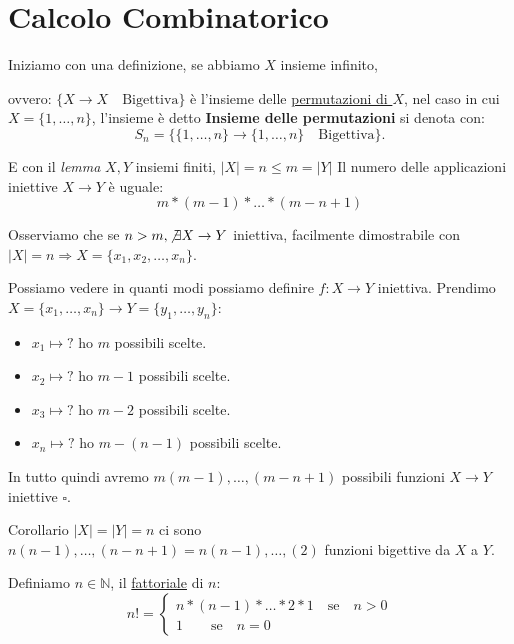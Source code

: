 \documentclass{article}
\begin{document}
\newpage
\section{Calcolo Combinatorico}

Iniziamo con una definizione, se abbiamo $X$ insieme infinito, \par ovvero: $\{X \to X \quad \mbox{Bigettiva}\}$ è l'insieme delle \underline{permutazioni di $X$}, nel caso in cui $X = \{1,\ldots, n\}$, l'insieme è detto \textbf{Insieme delle permutazioni} si denota con:
\begin{equation*}
        S_n = \{\{1,\ldots, n\} \to \{ 1,\ldots,n\} \quad \mbox{Bigettiva}\}.
\end{equation*}

E con il \textit{lemma} $X,Y$ insiemi finiti, $|X| = n \le m = |Y|$ Il numero delle applicazioni iniettive $X \to Y$ è uguale:
\begin{equation*}
        m * (m-1)*\ldots*(m-n+1)
\end{equation*}

Osserviamo che se $n > m, \not \exists X \to Y$ iniettiva, facilmente dimostrabile con $|X| = n \Rightarrow X = \{x_1,x_2,\ldots,x_n\}$. \par
Possiamo vedere in quanti modi possiamo definire $f:X \to Y$ iniettiva. 
Prendimo $X = \{x_1,\ldots,x_n\} \to Y = \{y_1,\ldots,y_n\}$:
\begin{itemize}
        \item $x_1 \mapsto \mbox{?}$ ho $m$ possibili scelte.
        \item $x_2 \mapsto \mbox{?}$ ho $m-1$ possibili scelte.
        \item $x_3 \mapsto \mbox{?}$ ho $m-2$ possibili scelte.
        \item $x_n \mapsto \mbox{?}$ ho $m-(n-1)$ possibili scelte.
\end{itemize}

In tutto quindi avremo $m(m-1),\ldots,(m-n+1)$ possibili funzioni $X \to Y$ iniettive $\square$. \par

Corollario $|X| = |Y| = n$ ci sono $n(n-1),\ldots,(n-n+1) = n(n-1),\ldots,(2)$ funzioni bigettive da $X$ a $Y$. \par
Definiamo $n \in \mathbb{N}$, il \underline{fattoriale} di $n$:
\[ n! = 
\begin{cases}
        n * (n-1) * \ldots * 2 * 1 \quad \mbox{se} \quad n>0\\
        1 \quad \quad \mbox{se} \quad n = 0
\end{cases}
\]
\end{document}
